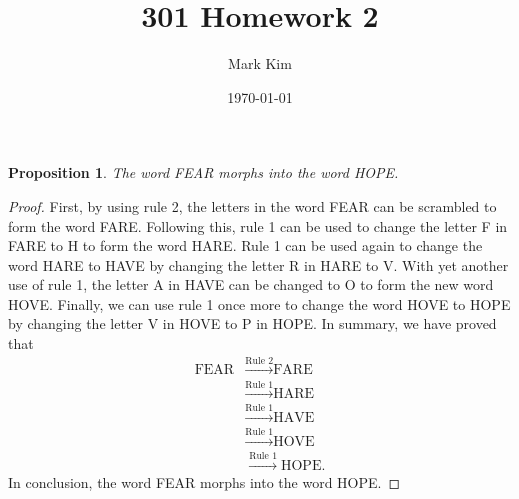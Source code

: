 \documentclass[12pt]{amsart}
\title{301 Homework 2}
\author{Mark Kim}
\date{\today}
\newtheorem*{proposition}{Proposition}
\begin{document}
\maketitle

\begin{proposition}
The word FEAR morphs into the word HOPE.
\end{proposition}

\begin{proof}
First, by using rule 2, the letters in the word FEAR can be scrambled to form the word FARE.  Following this, rule 1 can be used to change the letter F in FARE to H to form the word HARE.  Rule 1 can be used again to change the word HARE to HAVE by changing the letter R in HARE to V.  With yet another use of rule 1, the letter A in HAVE can be changed to O to form the new word HOVE.  Finally, we can use rule 1 once more to change the word HOVE to HOPE by changing the letter V in HOVE to P in HOPE.  In summary, we have proved that
\begin{align*}
\text{FEAR}&\stackrel{\text{Rule 2}}{\longrightarrow}\text{FARE}\\
&\stackrel{\text{Rule 1}}{\longrightarrow}\text{HARE}\\
&\stackrel{\text{Rule 1}}{\longrightarrow}\text{HAVE}\\
&\stackrel{\text{Rule 1}}{\longrightarrow}\text{HOVE}\\
&\stackrel{\text{Rule 1}}{\longrightarrow}\text{HOPE}.
\end{align*}
In conclusion, the word FEAR morphs into the word HOPE.
\end{proof}
\end{document}
